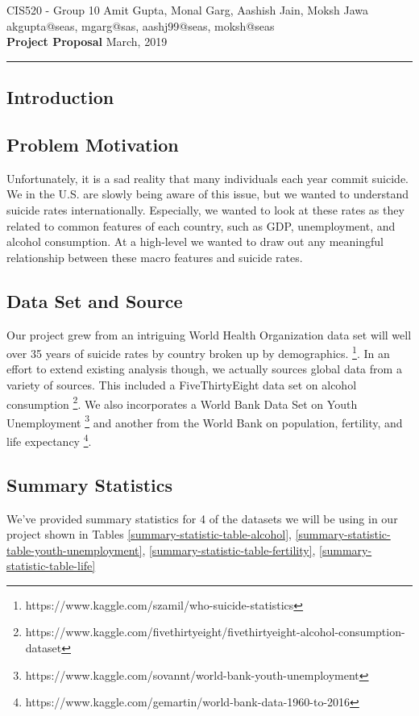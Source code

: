 \documentclass{article}
\makeatletter
\newcommand{\MyName}{Amit Gupta, Monal Garg, Aashish Jain, Moksh Jawa}
\newcommand{\MyPennKey}{akgupta@seas, mgarg@sas, aashj99@seas, moksh@seas}
\newcommand{\Class}{CIS520}
\newcommand{\PrintFirstHeader}{
  \Large{\Class} - \large{Group 10} \hfill {\Large{\MyName}}
  \\
   \vspace{5pt} \hfill \normalsize{\MyPennKey}
  \\
  {\LARGE{\textbf{Project Proposal}}}  \hfill {\Large{March, 2019}}

  \rule{\textwidth}{0.4pt}}
\makeatother
\begin{document}
\thispagestyle{firstpage}
\PrintFirstHeader{}

\begin{multicols}{2}

\section{Introduction}
\subsection{Problem Motivation} Unfortunately, it is a sad reality that many individuals each year commit suicide. We in the U.S. are slowly being aware of this issue, but we wanted to understand suicide rates internationally. Especially, we wanted to look at these rates as they related to common features of each country, such as GDP, unemployment, and alcohol consumption. At a high-level we wanted to draw out any meaningful relationship between these macro features and suicide rates.
\subsection{Data Set and Source} Our project grew from an intriguing 
World Health Organization data set will well over 35 years of suicide rates by country broken up by demographics.  \footnote{https://www.kaggle.com/szamil/who-suicide-statistics}. In an effort to extend existing analysis though, we actually sources global data from a variety of sources. This included a FiveThirtyEight data set on alcohol consumption \footnote{https://www.kaggle.com/fivethirtyeight/fivethirtyeight-alcohol-consumption-dataset}. We also incorporates a World Bank Data Set on Youth Unemployment \footnote{https://www.kaggle.com/sovannt/world-bank-youth-unemployment} and another from the World Bank on population, fertility, and life expectancy \footnote{https://www.kaggle.com/gemartin/world-bank-data-1960-to-2016}.
\subsection{Summary Statistics} 
We've provided summary statistics for 4 of the datasets we will be using in our project shown in Tables \ref{summary-statistic-table-alcohol}, \ref{summary-statistic-table-youth-unemployment}, \ref{summary-statistic-table-fertility}, \ref{summary-statistic-table-life}

\end{multicols}
\end{document}
